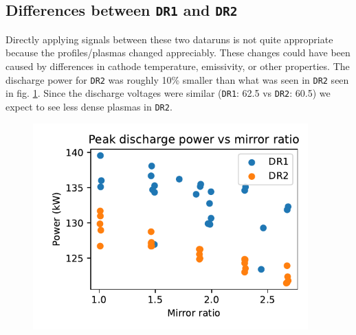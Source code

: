 \subsection{Differences between \texttt{DR1} and \texttt{DR2}}
Directly applying signals between these two dataruns is not quite appropriate because the profiles/plasmas changed appreciably. These changes could have been caused by differences in cathode temperature, emissivity, or other properties. The discharge power for \texttt{DR2} was roughly 10\% smaller than what was seen in \texttt{DR2} seen in fig. \ref{fig_extra:discharger-power_vs_M}. Since the discharge voltages were similar (\texttt{DR1}: 62.5 vs \texttt{DR2}: 60.5) we expect to see less dense plasmas in \texttt{DR2}. 
\begin{figure}
    \centering
    \includegraphics[width=300pt]{figures/extra/discharge-power_vs_M.pdf}
    \caption[Discharge power vs mirror ratio]{}
    \label{fig_extra:discharger-power_vs_M}
\end{figure}

